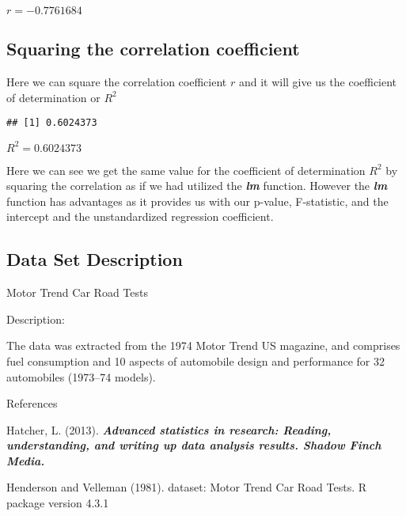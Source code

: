 \documentclass[
]{book}
\newenvironment{Shaded}{\begin{snugshade}}{\end{snugshade}}
\newcommand{\AttributeTok}[1]{\textcolor[rgb]{0.13,0.29,0.53}{#1}}
\newcommand{\DecValTok}[1]{\textcolor[rgb]{0.00,0.00,0.81}{#1}}
\newcommand{\FunctionTok}[1]{\textcolor[rgb]{0.13,0.29,0.53}{\textbf{#1}}}
\newcommand{\NormalTok}[1]{#1}
\newcommand{\SpecialCharTok}[1]{\textcolor[rgb]{0.81,0.36,0.00}{\textbf{#1}}}
\theoremstyle{definition}
\theoremstyle{definition}
\theoremstyle{definition}
\theoremstyle{definition}
\theoremstyle{remark}
\begin{document}
\({r} = -0.7761684\)

\hypertarget{squaring-the-correlation-coefficient}{%
\subsection{Squaring the correlation coefficient}\label{squaring-the-correlation-coefficient}}

Here we can square the correlation coefficient \({r}\) and it will give us the coefficient of determination or \({R^2}\)

\begin{Shaded}
\end{Shaded}

\begin{verbatim}
## [1] 0.6024373
\end{verbatim}

\({R^2} = 0.6024373\)

Here we can see we get the same value for the coefficient of determination \({R^2}\) by squaring the correlation as if we had utilized the \textbf{\emph{lm}} function. However the \textbf{\emph{lm}} function has advantages as it provides us with our p-value, F-statistic, and the intercept and the unstandardized regression coefficient.

\hypertarget{data-set-description}{%
\subsection{Data Set Description}\label{data-set-description}}

Motor Trend Car Road Tests

Description:

The data was extracted from the 1974 Motor Trend US magazine, and comprises fuel consumption and 10 aspects of automobile design and performance for 32 automobiles (1973--74 models).

References

Hatcher, L. (2013). \textbf{\emph{Advanced statistics in research: Reading, understanding, and writing up data analysis results. Shadow Finch Media.}}

Henderson and Velleman (1981). dataset: Motor Trend Car Road Tests. R package version 4.3.1
\end{document}
